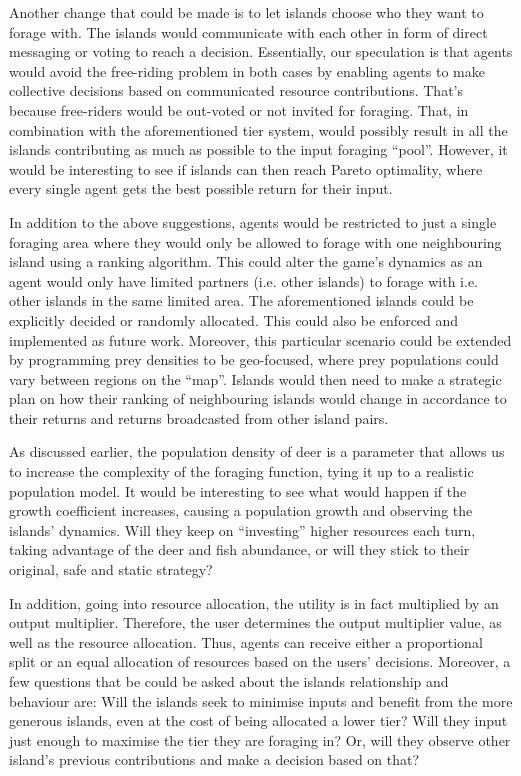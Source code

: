 Another change that could be made is to let islands choose who they want to forage with. The islands would communicate with each other in form of direct messaging or voting to reach a decision. 
Essentially, our speculation is that agents would avoid the free-riding problem in both cases by enabling agents to make collective decisions based on communicated resource contributions. That’s because free-riders would be out-voted or not invited for foraging. That, in combination with the aforementioned tier system, would possibly result in all the islands contributing as much as possible to the input foraging “pool”. However, it would be interesting to see if islands can then reach Pareto optimality, where every single agent gets the best possible return for their input.

In addition to the above suggestions, agents would be restricted to just a single foraging area where they would only be allowed to forage with one neighbouring island using a ranking algorithm. This could alter the game's dynamics as an agent would only have limited partners (i.e. other islands) to forage with i.e. other islands in the same limited area. The aforementioned islands could be explicitly decided or randomly allocated. This could also be enforced and implemented as future work. Moreover, this particular scenario could be extended by programming prey densities to be geo-focused, where prey populations could vary between regions on the “map”. Islands would then need to make a strategic plan on how their ranking of neighbouring islands would change in accordance to their returns and returns broadcasted from other island pairs.

As discussed earlier, the population density of deer is a parameter that allows us to increase the complexity of the foraging function, tying it up to a realistic population model. It would be interesting to see what would happen if the growth coefficient increases, causing a population growth and observing the islands’ dynamics. Will they keep on “investing” higher resources each turn, taking advantage of the deer and fish abundance, or will they stick to their original, safe and static strategy?

In addition, going into resource allocation, the utility is in fact multiplied by an output multiplier. Therefore, the user determines the output multiplier value, as well as the resource allocation. Thus, agents can receive either a proportional split or an equal allocation of resources based on the users' decisions. Moreover, a few questions that be could be asked about the islands relationship and behaviour are: Will the islands seek to minimise inputs and benefit from the more generous islands, even at the cost of being allocated a lower tier? Will they input just enough to maximise the tier they are foraging in? Or, will they observe other island’s previous contributions and make a decision based on that?

